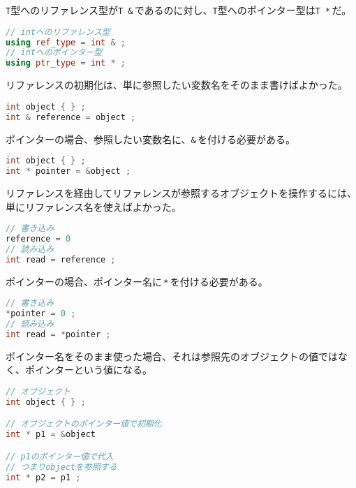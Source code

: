 \texttt{T}型へのリファレンス型が\texttt{T \&}\,であるのに対し、\texttt{T}型へのポインター型は\texttt{T *}\,だ。

\ifTombow\pagebreak\fi
\begin{lstlisting}[language={C++}]
// intへのリファレンス型
using ref_type = int & ;
// intへのポインター型
using ptr_type = int * ;
\end{lstlisting}

リファレンスの初期化は、単に参照したい変数名をそのまま書けばよかった。

\begin{lstlisting}[language={C++}]
int object { } ;
int & reference = object ;
\end{lstlisting}

ポインターの場合、参照したい変数名に、\texttt{\&}\,を付ける必要がある。

\begin{lstlisting}[language={C++}]
int object { } ;
int * pointer = &object ;
\end{lstlisting}

リファレンスを経由してリファレンスが参照するオブジェクトを操作するには、単にリファレンス名を使えばよかった。

\begin{lstlisting}[language={C++}]
// 書き込み
reference = 0
// 読み込み
int read = reference ;  
\end{lstlisting}

ポインターの場合、ポインター名に\,\texttt{*}\,を付ける必要がある。

\begin{lstlisting}[language={C++}]
// 書き込み
*pointer = 0 ;
// 読み込み
int read = *pointer ;
\end{lstlisting}

ポインター名をそのまま使った場合、それは参照先のオブジェクトの値ではなく、ポインターという値になる。

\begin{lstlisting}[language={C++}]
// オブジェクト
int object { } ;

// オブジェクトのポインター値で初期化
int * p1 = &object

// p1のポインター値で代入
// つまりobjectを参照する
int * p2 = p1 ;
\end{lstlisting}

